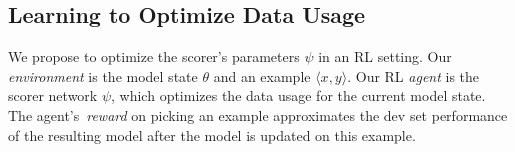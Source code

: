 \subsection{\label{sec:efficient_reward} Learning to Optimize Data Usage}
We propose to optimize the scorer's parameters $\psi$ in an RL setting.
Our \emph{environment} is the model state $\theta$ and an example $\langle x, y \rangle$. Our RL \emph{agent} is the scorer network $\psi$, which optimizes the data usage for the current model state. The agent's~\emph{reward} on picking an example approximates the dev set performance of the resulting model after the model is updated on this example.



